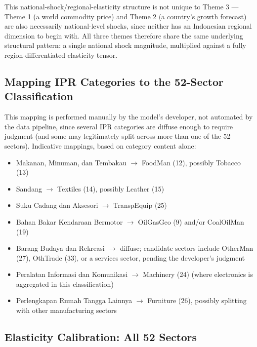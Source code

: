 \documentclass[11pt]{article}
\begin{document}
\begin{decisionbox}
This national-shock/regional-elasticity structure is not unique to Theme 3
--- Theme 1 (a world commodity price) and Theme 2 (a country's growth
forecast) are also necessarily national-level shocks, since neither has an
Indonesian regional dimension to begin with. All three themes therefore
share the same underlying structural pattern: a single national shock
magnitude, multiplied against a fully region-differentiated elasticity
tensor.
\end{decisionbox}

\subsection{Mapping IPR Categories to the 52-Sector Classification}
\label{sec:theme3-mapping}

This mapping is performed manually by the model's developer, not
automated by the data pipeline, since several IPR categories are diffuse
enough to require judgment (and some may legitimately split across more
than one of the 52 sectors). Indicative mappings, based on category content
alone:

\begin{itemize}
  \item Makanan, Minuman, dan Tembakau $\to$ FoodMan (12), possibly
  Tobacco (13)
  \item Sandang $\to$ Textiles (14), possibly Leather (15)
  \item Suku Cadang dan Aksesori $\to$ TranspEquip (25)
  \item Bahan Bakar Kendaraan Bermotor $\to$ OilGasGeo (9) and/or
  CoalOilMan (19)
  \item Barang Budaya dan Rekreasi $\to$ diffuse; candidate sectors include
  OtherMan (27), OthTrade (33), or a services sector, pending the
  developer's judgment
  \item Peralatan Informasi dan Komunikasi $\to$ Machinery (24) (where
  electronics is aggregated in this classification)
  \item Perlengkapan Rumah Tangga Lainnya $\to$ Furniture (26), possibly
  splitting with other manufacturing sectors
\end{itemize}

\subsection{Elasticity Calibration: All 52 Sectors}
\label{sec:theme3-calibration}
\end{document}
